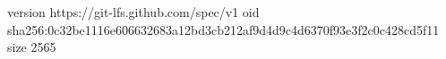 version https://git-lfs.github.com/spec/v1
oid sha256:0c32be1116e606632683a12bd3cb212af9d4d9c4d6370f93e3f2c0c428cd5f11
size 2565
